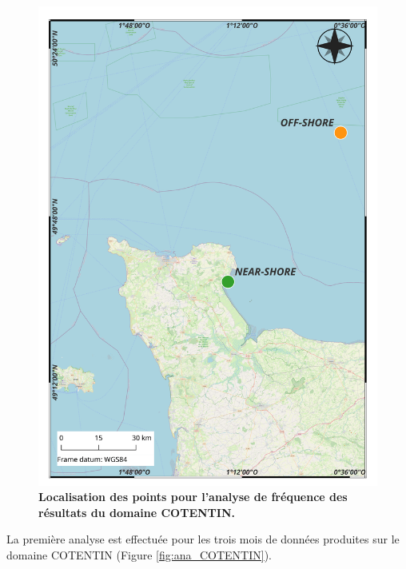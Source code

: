 \documentclass[10pt,a4paper,titlepage]{article}
\begin{document}
\begin{figure}[H]
    \centering
    \includegraphics[scale=0.3]{../images/COTENTIN_localisation_QGIS.png}
    \caption{
        \textbf{Localisation des points pour l'analyse de fréquence des résultats du domaine COTENTIN.}
    }
    \label{fig:loc_COTENTIN}
\end{figure}

La première analyse est effectuée pour les trois mois de données produites sur le domaine COTENTIN (Figure \ref{fig:ana_COTENTIN}).

\end{document}
